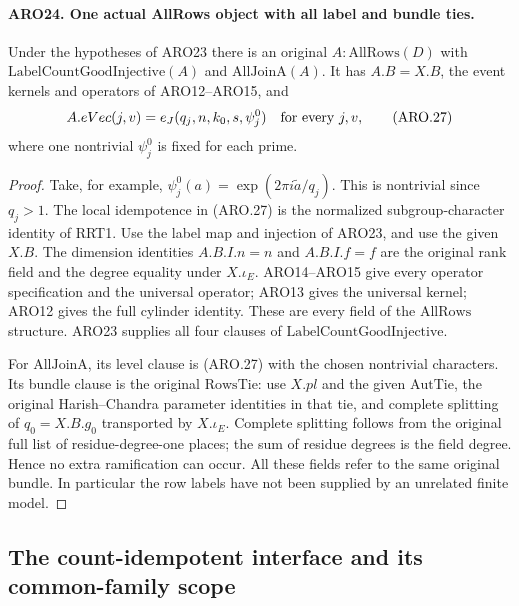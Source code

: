 \documentclass[11pt,a4paper]{article}
\numberwithin{equation}{section}
\theoremstyle{remark}\newtheorem{remark}[theorem]{Remark}
\begin{document}
\paragraph{ARO24. One actual AllRows object with all label and bundle ties.}
\label{claim:ARO24}
Under the hypotheses of ARO23 there is an original
\(A:\mathrm{AllRows}(D)\) with
\(\mathrm{LabelCountGoodInjective}(A)\) and
\(\mathrm{AllJoinA}(A)\).  It has \(A.B=X.B\), the event kernels
and operators of ARO12--ARO15, and
\[
                 A.eVec(j,v)=e_J(q_j,n,k_0,s,\psi_j^0)
                    \quad\hbox{for every }j,v,        \tag{ARO.27}
\]
where one nontrivial \(\psi_j^0\) is fixed for each prime.
\begin{proof}
Take, for example, \(\psi_j^0(a)=\exp(2\pi i\widetilde a/q_j)\).
This is nontrivial since \(q_j>1\).  The local idempotence in
(ARO.27) is the normalized subgroup-character identity of RRT1.
Use the label map and injection of ARO23, and use the given
\(X.B\).  The dimension identities \(A.B.I.n=n\) and
\(A.B.I.f=f\) are the original rank field and the degree equality
under \(X.\iota_E\).  ARO14--ARO15 give every operator specification
and the universal operator; ARO13 gives the universal kernel;
ARO12 gives the full cylinder identity.  These are every field
of the \(\mathrm{AllRows}\) structure.  ARO23 supplies all four
clauses of \(\mathrm{LabelCountGoodInjective}\).

For \(\mathrm{AllJoinA}\), its level clause is (ARO.27) with the
chosen nontrivial characters.  Its bundle clause is the original
\(\mathrm{RowsTie}\): use \(X.pl\) and the given \(\mathrm{AutTie}\),
the original Harish--Chandra parameter identities in that tie, and
complete splitting of \(q_0=X.B.g_0\) transported by
\(X.\iota_E\).  Complete splitting follows from the original
full list of residue-degree-one places; the sum of residue degrees
is the field degree.  Hence no extra ramification can occur.
All these fields refer to the same original bundle.  In particular
the row labels have not been supplied by an unrelated finite model.
\end{proof}

\subsection{The count-idempotent interface and its common-family scope}

\end{document}
